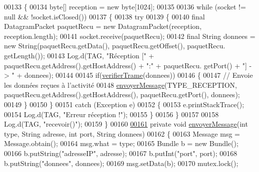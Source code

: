 \begin{DoxyCode}
00133     \{
00134         byte[] reception = \textcolor{keyword}{new} byte[1024];
00135 
00136         \textcolor{keywordflow}{while} (socket != null && !socket.isClosed())
00137         \{
00138             \textcolor{keywordflow}{try}
00139             \{
00140                 \textcolor{keyword}{final} DatagramPacket paquetRecu = \textcolor{keyword}{new} DatagramPacket(reception, reception.length);
00141                 socket.receive(paquetRecu);
00142                 \textcolor{keyword}{final} String donnees = \textcolor{keyword}{new} String(paquetRecu.getData(), paquetRecu.getOffset(), paquetRecu.
      getLength());
00143                 Log.d(TAG, \textcolor{stringliteral}{"Réception ["} + paquetRecu.getAddress().getHostAddress() + \textcolor{stringliteral}{":"} + paquetRecu.
      getPort() + \textcolor{stringliteral}{"] -> "} + donnees);
00144 
00145                 \textcolor{keywordflow}{if}(\hyperlink{classcom_1_1lasalle_1_1meeting_1_1_communication_af3090814ffb2fc9537961be52ebd17c2}{verifierTrame}(donnees))
00146                 \{
00147                     \textcolor{comment}{// Envoie les données reçues à l'activité}
00148                     \hyperlink{classcom_1_1lasalle_1_1meeting_1_1_communication_a7fa206969cf5dc48f4660845bbff0fc1}{envoyerMessage}(TYPE\_RECEPTION, paquetRecu.getAddress().getHostAddress(), 
      paquetRecu.getPort(), donnees);
00149                 \}
00150             \}
00151             \textcolor{keywordflow}{catch} (Exception e)
00152             \{
00153                 e.printStackTrace();
00154                 Log.d(TAG, \textcolor{stringliteral}{"Erreur réception !"});
00155             \}
00156         \}
00157 
00158         Log.d(TAG, \textcolor{stringliteral}{"recevoir()"});
00159     \}
00160 
\hyperlink{classcom_1_1lasalle_1_1meeting_1_1_communication_a7fa206969cf5dc48f4660845bbff0fc1}{00161}     \textcolor{keyword}{private} \textcolor{keywordtype}{void} \hyperlink{classcom_1_1lasalle_1_1meeting_1_1_communication_a7fa206969cf5dc48f4660845bbff0fc1}{envoyerMessage}(\textcolor{keywordtype}{int} type, String adresse, \textcolor{keywordtype}{int} port, String donnees)
00162     \{
00163         Message msg = Message.obtain();
00164         msg.what = type;
00165         Bundle b = \textcolor{keyword}{new} Bundle();
00166         b.putString(\textcolor{stringliteral}{"adresseIP"}, adresse);
00167         b.putInt(\textcolor{stringliteral}{"port"}, port);
00168         b.putString(\textcolor{stringliteral}{"donnees"}, donnees);
00169         msg.setData(b);
00170         mutex.lock();

\end{DoxyCode}

